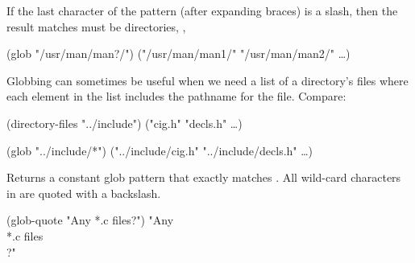 \begin{desc}
If the last character of the pattern (after expanding braces) is a slash,
then the result matches must be directories, \eg,
\begin{code}
(glob "/usr/man/man?/") \evalto
        ("/usr/man/man1/" "/usr/man/man2/" \ldots)\end{code}

Globbing can sometimes be useful when we need a list of a directory's files
where each element in the list includes the pathname for the file.
Compare:
\begin{code}
(directory-files "../include") \evalto
    ("cig.h" "decls.h" \ldots)

(glob "../include/*") \evalto
    ("../include/cig.h" "../include/decls.h" \ldots)\end{code}
\end{desc}

\str
\begin{desc}
Returns a constant glob pattern that exactly matches .
All wild-card characters in  are quoted with a backslash.
\begin{code}
(glob-quote "Any *.c files?")
    {\evalto}"Any \\*.c files\\?"\end{code}
\end{desc}


